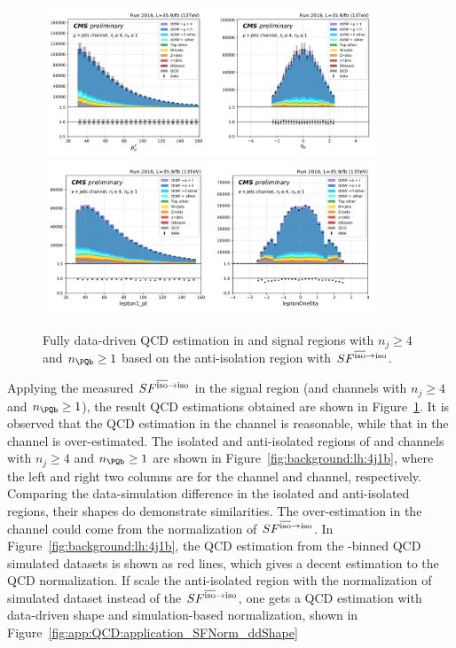 \begin{figure}
    \centering
    \includegraphics[width=0.9\textwidth]{chapters/Analysis/sectionBackground/figures/ljets_application/ddNorm_ddShape_mu4j.png}
    \includegraphics[width=0.9\textwidth]{chapters/Analysis/sectionBackground/figures/ljets_application/ddNorm_ddShape_e4j.png}
    \caption{Fully data-driven QCD estimation in \cmh and \ceh signal regions with $n_j\geq4$ and $n_\PQb\geq1$ based on the anti-isolation region with $SF^{\rm \overline{iso} \to iso}$.}
    \label{fig:background:lh:application_ddNorm_ddShape}
\end{figure}




Applying the measured $SF^{\rm \overline{iso} \to iso}$ in the signal region (\ceh and \cmh channels with $n_j\geq4$ and $n_\PQb\geq1$), the result QCD estimations obtained are shown in Figure~\ref{fig:background:lh:application_ddNorm_ddShape}. It is observed that the QCD estimation in the \cmh channel is reasonable, while that in the \ceh channel is over-estimated. The isolated and anti-isolated regions of \ceh and \cmh channels with $n_j\geq4$ and $n_\PQb\geq1$ are shown in Figure~\ref{fig:background:lh:4j1b}, where the left and right two columns are for the \cmh channel and \ceh channel, respectively. Comparing the data-simulation difference in the isolated and anti-isolated regions, their shapes do demonstrate similarities. The over-estimation in the \ceh channel could come from the normalization of $SF^{\rm \overline{iso} \to iso}$. In Figure~\ref{fig:background:lh:4j1b}, the QCD estimation from the \HT-binned QCD simulated  datasets is shown as red lines, which gives a decent estimation to the QCD normalization. If scale the anti-isolated region with the normalization of simulated dataset instead of the $SF^{\rm \overline{iso} \to iso}$, one gets a QCD estimation with data-driven shape and simulation-based normalization, shown in Figure~\ref{fig:app:QCD:application_SFNorm_ddShape}

